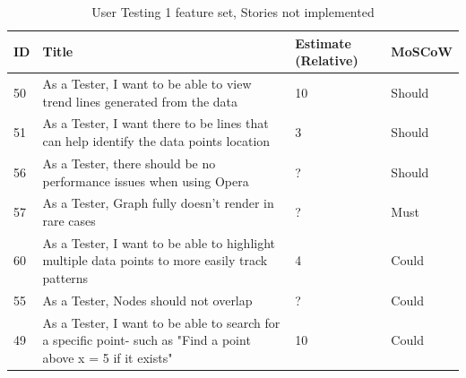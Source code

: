 \begin{table}[hbt!]
    \begin{tabularx}{\textwidth}{ | X | X | X | X | }
        \hline
        ID & Title                                                                                                          & Estimate (Relative) & MoSCoW \\
        \hline
        50 & As a Tester, I want to be able to view trend lines generated from the data                                     & 10                  & Should \\
        \hline
        51 & As a Tester, I want there to be lines that can help identify the data points location                          & 3                   & Should \\
        \hline
        56 & As a Tester, there should be no performance issues when using Opera                                            & ?                   & Should \\
        \hline
        57 & As a Tester, Graph fully doesn't render in rare cases                                                          & ?                   & Must   \\
        \hline
        60 & As a Tester, I want to be able to highlight multiple data points to more easily track patterns                 & 4                   & Could  \\
        \hline
        55 & As a Tester, Nodes should not overlap                                                                          & ?                   & Could  \\
        \hline
        49 & As a Tester, I want to be able to search for a specific point- such as "Find a point above x = 5 if it exists" & 10                  & Could  \\
        \hline
    \end{tabularx}
    \caption{User Testing 1 feature set, Stories not implemented}
    \label{UT1}
\end{table}

